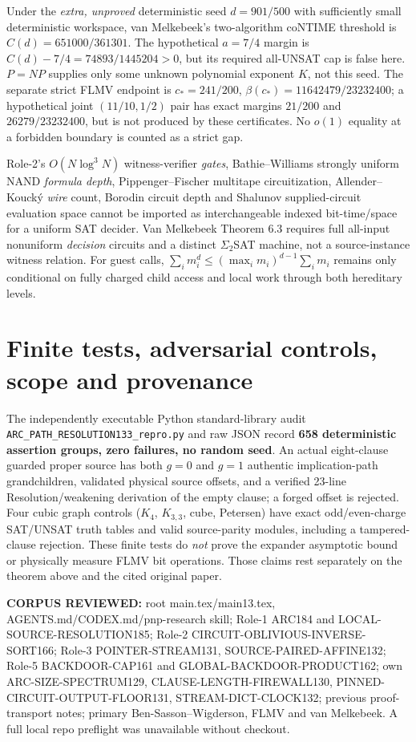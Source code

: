 \documentclass[11pt]{article}
\begin{document}
Under the \emph{extra, unproved} deterministic seed $d=901/500$ with sufficiently small deterministic workspace, van Melkebeek's two-algorithm coNTIME threshold is $C(d)=651000/361301$. The hypothetical $a=7/4$ margin is $C(d)-7/4=74893/1445204>0$, but its required all-UNSAT cap is false here. $P=NP$ supplies only some unknown polynomial exponent $K$, not this seed. The separate strict FLMV endpoint is $c_*=241/200$, $\beta(c_*)=11642479/23232400$; a hypothetical joint $(11/10,1/2)$ pair has exact margins $21/200$ and $26279/23232400$, but is not produced by these certificates. No $o(1)$ equality at a forbidden boundary is counted as a strict gap.

Role-2's $O(N\log^3 N)$ witness-verifier \emph{gates}, Bathie--Williams strongly uniform NAND \emph{formula depth}, Pippenger--Fischer multitape circuitization, Allender--Kouck\'y \emph{wire} count, Borodin circuit depth and Shalunov supplied-circuit evaluation space cannot be imported as interchangeable indexed bit-time/space for a uniform SAT decider. Van Melkebeek Theorem 6.3 requires full all-input nonuniform \emph{decision} circuits and a distinct $\Sigma_2$SAT machine, not a source-instance witness relation. For guest calls, $\sum_i m_i^d\le (\max_i m_i)^{d-1}\sum_i m_i$ remains only conditional on fully charged child access and local work through both hereditary levels.

\section{Finite tests, adversarial controls, scope and provenance}
The independently executable Python standard-library audit \texttt{ARC\_PATH\_RESOLUTION133\_repro.py} and raw JSON record \textbf{658 deterministic assertion groups, zero failures, no random seed}. An actual eight-clause guarded proper source has both $g=0$ and $g=1$ authentic implication-path grandchildren, validated physical source offsets, and a verified 23-line Resolution/weakening derivation of the empty clause; a forged offset is rejected. Four cubic graph controls ($K_4$, $K_{3,3}$, cube, Petersen) have exact odd/even-charge SAT/UNSAT truth tables and valid source-parity modules, including a tampered-clause rejection. These finite tests do \emph{not} prove the expander asymptotic bound or physically measure FLMV bit operations. Those claims rest separately on the theorem above and the cited original paper.

\noindent\textbf{CORPUS REVIEWED:} root main.tex/main13.tex, AGENTS.md/CODEX.md/pnp-research skill; Role-1 ARC184 and LOCAL-SOURCE-RESOLUTION185; Role-2 CIRCUIT-OBLIVIOUS-INVERSE-SORT166; Role-3 POINTER-STREAM131, SOURCE-PAIRED-AFFINE132; Role-5 BACKDOOR-CAP161 and GLOBAL-BACKDOOR-PRODUCT162; own ARC-SIZE-SPECTRUM129, CLAUSE-LENGTH-FIREWALL130, PINNED-CIRCUIT-OUTPUT-FLOOR131, STREAM-DICT-CLOCK132; previous proof-transport notes; primary Ben-Sasson--Wigderson, FLMV and van Melkebeek. A full local repo preflight was unavailable without checkout.
\end{document}
